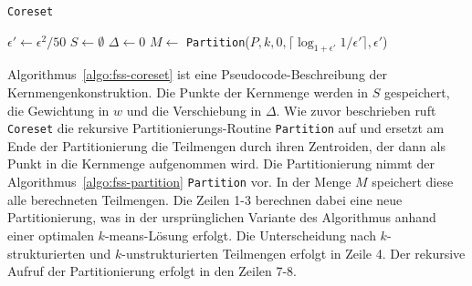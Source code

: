 \begin{algorithm}
\caption{\texttt{Coreset}~\cite{FeldmanSS13,Schmidt14}}
\label{algo:fss-coreset}
	\DontPrintSemicolon
	
	\BlankLine
	
	$\epsilon' \leftarrow \epsilon^2/50$\;
	$S \leftarrow \emptyset$\;
	$\Delta \leftarrow 0$\;
	$M \leftarrow $ \texttt{Partition}($P,k,0,\lceil \log_{1+\epsilon'} 1/\epsilon' \rceil, \epsilon'$)\;
\end{algorithm}
Algorithmus~\ref{algo:fss-coreset} ist eine Pseudocode-Beschreibung der Kernmengenkonstruktion. Die Punkte der Kernmenge
werden in $S$ gespeichert, die Gewichtung in $w$ und die Verschiebung in $\Delta$. Wie zuvor beschrieben ruft \texttt{Coreset}
die rekursive Partitionierungs-Routine \texttt{Partition} auf und ersetzt am Ende der Partitionierung die Teilmengen durch
ihren Zentroiden, der dann als Punkt in die Kernmenge aufgenommen wird.
\absatz
Die Partitionierung nimmt der Algorithmus~\ref{algo:fss-partition} \texttt{Partition} vor. In der Menge $M$ speichert diese
alle berechneten Teilmengen. Die Zeilen 1-3 berechnen dabei eine neue Partitionierung, was in der ursprünglichen Variante
des Algorithmus anhand einer optimalen $k$-means-Lösung erfolgt. Die Unterscheidung nach $k$-strukturierten und
$k$-unstrukturierten Teilmengen erfolgt in Zeile 4. Der rekursive Aufruf der Partitionierung erfolgt in den Zeilen 7-8.

